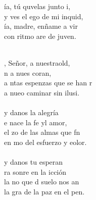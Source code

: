 \begin{cancion}%
	\begin{chorus}%
	ía, tú quvelas junto i,\\
	y ves el ego de mi inquid,\\
	ía, madre, enñame a vir \\
	con ritmo are de juven.\\
	\end{chorus}%
	\jump\\
	, Señor, a nuestraold,\\
	n a nues coran,\\
	a ntas espenzas que se han r\\
	a nueo caminar sin ilusi.\\
	\jump\\
	 y danos la alegría \\
	e nace la fe yl amor,\\
	el zo de las almas que fn\\
	en mo del esfuerzo y eolor.\\
	\jump\\
	 y danos tu esperan  \\
	ra sonre en la icción\\
	la no que d suelo nos an\\
	la gra de la paz en el pen. \\
	\jump\\
\end{cancion}%
